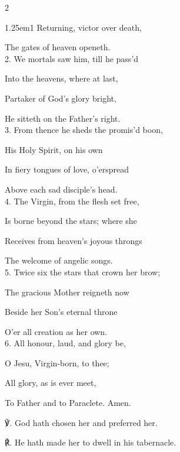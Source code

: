 \begin{paracol}{2}

\begin{hangparas}{1.25em}{1}
Returning, victor over death,

The gates of heaven openeth.\\

2. We mortals saw him, till he pass'd

Into the heavens, where at last,

Partaker of God’s glory bright,

He sitteth on the Father’s right.\\

3. From thence he sheds the promis'd boon,

His Holy Spirit, on his own

In fiery tongues of love, o’erspread

Above each sad disciple’s head.\\

4. The Virgin, from the flesh set free,

Is borne beyond the stars; where she

Receives from heaven’s joyous throngs

The welcome of angelic songs.\\

5. Twice six the stars that crown her brow;

The gracious Mother reigneth now

Beside her Son’s eternal throne

O'er all creation as her own.\\

6. All honour, laud, and glory be,

O Jesu, Virgin-born, to thee;

All glory, as is ever meet,

To Father and to Paraclete. Amen.\\
\end{hangparas}

℣. God hath chosen her and preferred her.

℟. He hath made her to dwell in his tabernacle.


\fussy	
\end{paracol}


